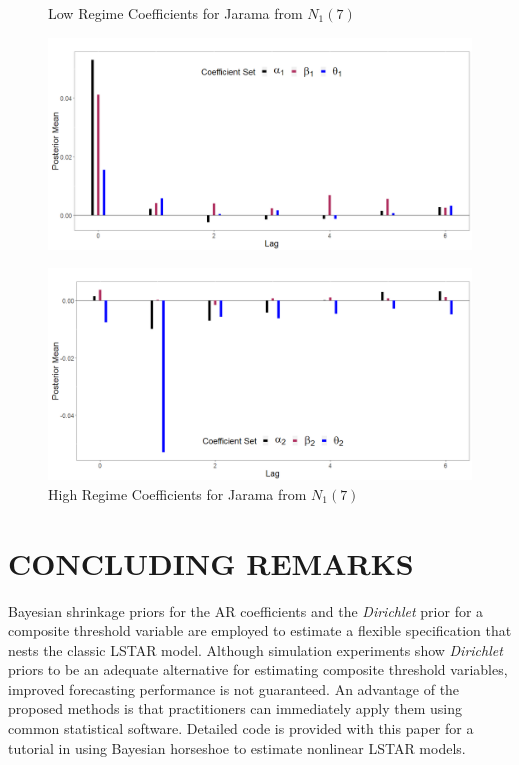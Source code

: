 \begin{figure}[!h]
\center
\begin{minipage}[h]{0.8\textwidth}
\caption{Low Regime Coefficients for Jarama from $N_1(7)$}
\label{fig:jar1}
\includegraphics[scale=0.29]{JaramaL}
\end{minipage} \hspace{\textwidth}
\begin{minipage}[h]{0.8\textwidth}
\caption{High Regime Coefficients for Jarama from $N_1(7)$}
\label{fig:jar2}
\includegraphics[scale=0.29]{JaramaH}
\end{minipage}
\end{figure}

\section{CONCLUDING REMARKS}

Bayesian shrinkage priors for the AR coefficients and the \textit{Dirichlet} prior for a composite threshold variable are employed to estimate a flexible specification that nests the classic LSTAR model. Although simulation experiments show \textit{Dirichlet} priors to be an adequate alternative for estimating composite threshold variables, improved forecasting performance is not guaranteed. An advantage of the proposed methods is that practitioners can immediately apply them using common statistical software. Detailed code is provided with this paper for a tutorial in using Bayesian horseshoe to estimate nonlinear LSTAR models.

